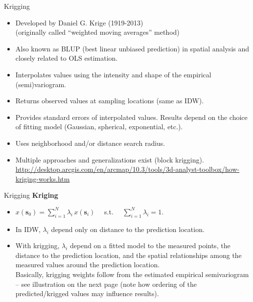 \documentclass{beamer}
\begin{document}
\begin{frame}{Krigging}
\begin{itemize}
    \item Developed by Daniel G. Krige (1919-2013) \\(originally called ``weighted moving averages'' method) 
    \smallskip
    \item Also known as BLUP (best linear unbiased prediction) in spatial analysis and closely related to OLS estimation.
    \smallskip
    \item Interpolates values using the intensity and shape of the empirical (semi)variogram. 
    \smallskip
    \item Returns observed values at sampling locations (same as IDW).
    \smallskip
    \item Provides standard errors of interpolated values. Results depend on the choice of fitting model (Gaussian, spherical, exponential, etc.).
    \smallskip
    \item Uses neighborhood and/or distance search radius.
    \smallskip
    \item Multiple approaches and generalizations exist (block krigging). \\
    \url{http://desktop.arcgis.com/en/arcmap/10.3/tools/3d-analyst-toolbox/how-kriging-works.htm}
\end{itemize}
\end{frame}
\begin{frame}{Krigging}
\textbf{Kriging}\\ \medskip
\begin{itemize}
    \item $x(\bm{s}_0)= \sum_{i=1}^N \lambda_i \, x(\bm{s}_i)$ ~~s.t.~~ $\sum_{i=1}^N \lambda_i = 1$. 
    \bigskip
    \item In IDW, $\lambda_i$ depend only on distance to the prediction location.\\
    \bigskip
    \item  With krigging, $\lambda_i$ depend on a fitted model to the measured points, the distance to the prediction location, and the spatial relationships among the measured values around the prediction location. \\ \medskip Basically, krigging weights follow from the estimated empirical semivariogram -- see illustration on the next page (note how ordering of the predicted/krigged values may influence results).
\end{itemize}
\end{frame}
\end{document}
